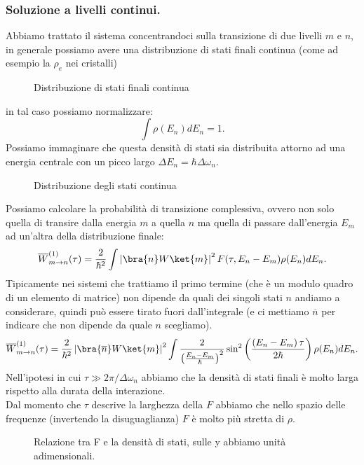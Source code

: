 \subsubsection{Soluzione a livelli continui.}%
Abbiamo trattato il sistema concentrandoci sulla transizione di due livelli $m$ e $n$, in generale possiamo avere una distribuzione di stati finali continua (come ad esempio la $\rho_e$ nei cristalli) 
\begin{figure}[H]
    \centering
    \caption{Distribuzione di stati finali continua}
    \label{fig:distribuzione-di-stati-finali-continua}
\end{figure}
\noindent
in tal caso possiamo normalizzare:
\[
    \int\rho(E_n) dE_n = 1
.\] 
Possiamo immaginare che questa densità di stati sia distribuita attorno ad una energia centrale con un picco largo $\Delta E_n = \hbar \Delta\omega_n $. 
\begin{figure}[H]
    \centering
    \caption{Distribuzione degli stati continua}
    \label{fig:distribuzione-degli-stati-continua}
\end{figure}
\noindent
Possiamo calcolare la probabilità di transizione complessiva, ovvero non solo quella di transire dalla energia $m$ a quella $n$ ma quella di passare dall'energia $E_m$ ad un'altra della distribuzione finale:
\[
    \overline{W}^{(1)}_{m\to n}(\tau) =
    \frac{2}{\hbar ^2}\int\left|\bra{n}W \ket{m}\right|^2 F(\tau, E_n-E_m)\rho(E_n) dE_n 
.\] 
Tipicamente nei sistemi che trattiamo il primo termine (che è un modulo quadro di un elemento di matrice) non dipende da quali dei singoli stati $n$ andiamo a considerare, quindi può essere tirato fuori dall'integrale (e ci mettiamo $\overline{n}$ per indicare che non dipende da quale $n$ scegliamo).
\[
    \overline{W}^{(1)}_{m\to n}(\tau) =
    \frac{2}{\hbar ^2}
    \left|\bra{\overline{n}}W \ket{m}\right|^2
    \int
    \frac{2}{\left(\frac{E_n-E_m}{\hbar }\right)^2}
    \sin^2\left(\frac{\left(E_n-E_m\right)\tau}{2\hbar }\right) 
    \rho(E_n) dE_n
.\] 
Nell'ipotesi in cui $\tau\gg 2\pi /\Delta\omega_n$ abbiamo che la densità di stati finali è molto larga rispetto alla durata della interazione. \\
Dal momento che $\tau$ descrive la larghezza della $F$ abbiamo che nello spazio delle frequenze (invertendo la disuguaglianza) $F$ è molto più stretta di $\rho$.
\begin{figure}[H]
    \centering
    \caption{Relazione tra F e la densità di stati, sulle y abbiamo unità adimensionali.}
    \label{fig:relazione-tra-f-e-la-densità-di-stati}
\end{figure}
